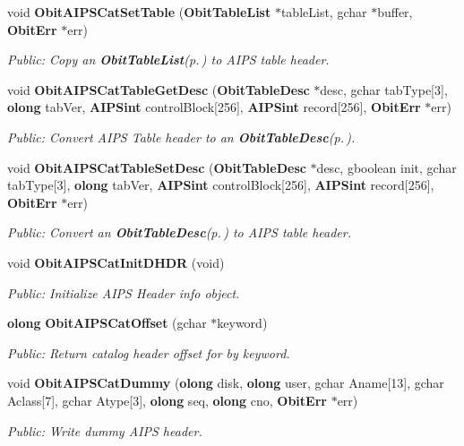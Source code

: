 \begin{CompactItemize}
void {\bf Obit\-AIPSCat\-Set\-Table} ({\bf Obit\-Table\-List} $\ast$table\-List, gchar $\ast$buffer, {\bf Obit\-Err} $\ast$err)
\begin{CompactList}\small\item\em Public: Copy an {\bf Obit\-Table\-List}{\rm (p.\,\pageref{structObitTableList})} to AIPS table header. \item\end{CompactList}\item 
void {\bf Obit\-AIPSCat\-Table\-Get\-Desc} ({\bf Obit\-Table\-Desc} $\ast$desc, gchar tab\-Type[3], {\bf olong} tab\-Ver, {\bf AIPSint} control\-Block[256], {\bf AIPSint} record[256], {\bf Obit\-Err} $\ast$err)
\begin{CompactList}\small\item\em Public: Convert AIPS Table header to an {\bf Obit\-Table\-Desc}{\rm (p.\,\pageref{structObitTableDesc})}. \item\end{CompactList}\item 
void {\bf Obit\-AIPSCat\-Table\-Set\-Desc} ({\bf Obit\-Table\-Desc} $\ast$desc, gboolean init, gchar tab\-Type[3], {\bf olong} tab\-Ver, {\bf AIPSint} control\-Block[256], {\bf AIPSint} record[256], {\bf Obit\-Err} $\ast$err)
\begin{CompactList}\small\item\em Public: Convert an {\bf Obit\-Table\-Desc}{\rm (p.\,\pageref{structObitTableDesc})} to AIPS table header. \item\end{CompactList}\item 
void {\bf Obit\-AIPSCat\-Init\-DHDR} (void)
\begin{CompactList}\small\item\em Public: Initialize AIPS Header info object. \item\end{CompactList}\item 
{\bf olong} {\bf Obit\-AIPSCat\-Offset} (gchar $\ast$keyword)
\begin{CompactList}\small\item\em Public: Return catalog header offset for by keyword. \item\end{CompactList}\item 
void {\bf Obit\-AIPSCat\-Dummy} ({\bf olong} disk, {\bf olong} user, gchar Aname[13], gchar Aclass[7], gchar Atype[3], {\bf olong} seq, {\bf olong} cno, {\bf Obit\-Err} $\ast$err)
\begin{CompactList}\small\item\em Public: Write dummy AIPS header. \item\end{CompactList}\item 

\end{CompactItemize}
